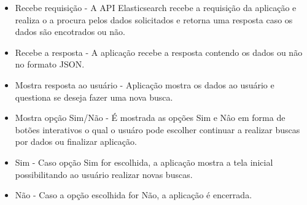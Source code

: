 \begin{itemize}
	\item Recebe requisição - A API Elasticsearch recebe a requisição da aplicação e realiza o a procura pelos dados solicitados e retorna uma resposta caso os dados são encotrados ou não.
	\item Recebe a resposta - A aplicação recebe a resposta contendo os dados ou não no formato JSON.
	\item Mostra resposta ao usuário - Aplicação mostra os dados ao usuário e questiona se deseja fazer uma nova busca.
	\item Mostra opção Sim/Não - É mostrada as opções Sim e Nâo em forma de botões interativos o qual o usuáro pode escolher continuar a realizar buscas por dados ou finalizar aplicação.
	\item Sim - Caso opção Sim for escolhida, a aplicação mostra a tela inicial possibilitando ao usuário realizar novas buscas.
	\item Não - Caso a opção escolhida for Não, a aplicação é encerrada.
\end{itemize}
